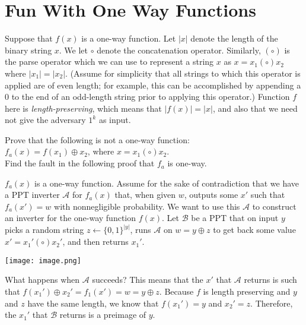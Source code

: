 \documentclass[10pt]{exam}
\begin{document}
\section{Fun With One Way Functions}
Suppose that $f(x)$ is a one-way function. Let $|x|$ denote the length of the binary string $x$. We let $\circ$ denote the concatenation operator. Similarly, $(\circ)$ is the parse operator which we can use to represent a string $x$ as $x = x_1(\circ)x_2$ where $|x_1| = |x_2|$. (Assume for simplicity that all strings to which this operator is applied are of even length; for example, this can be accomplished by appending a $0$ to the end of an odd-length string prior to applying this operator.) Function $f$ here is \textit{length-preserving}, which means that $|f(x)| = |x|$, and also that we need not give the adversary $1^k$ as input.
\begin{questions}


\question[3] Prove that the following is not a one-way function:\\
$f_a(x)=f(x_1)\oplus x_2$, where $x=x_1(\circ)x_2$.\\

\question[3] Find the fault in the following proof that $f_a$ is one-way.

$f_a(x)$ is a one-way function. Assume for the sake of contradiction that we have a PPT inverter $\mathcal{A}$ for $f_a(x)$ that, when given ${w}$, outputs some $x'$ such that $f_a(x')={w}$ with nonnegligible probability. We want to use this $\mathcal{A}$ to construct an inverter for the one-way function $f(x)$. Let $\mathcal{B}$ be a PPT that on input $y$ picks a random string $z\leftarrow \{0,1\}^{|y|}$, runs $\mathcal{A}$ on ${w}=y\oplus z$ to get back some value $x'=x_1'(\circ)x_2'$, and then returns $x_1'$.\\
\begin{center}
\texttt{[image: image.png]}\vspace{0.5cm}
\end{center}
What happens when $\mathcal{A}$ succeeds? This means that the $x'$ that $\mathcal{A}$ returns is such that $f(x_1')\oplus x_2'=f_1(x')={w}=y\oplus z$. Because $f$ is length preserving and $y$ and $z$ have the same length, we know that $f(x_1')=y$ and $x_2'=z$. Therefore, the $x_1'$ that $\mathcal{B}$ returns is a preimage of $y$. 


\end{questions}
\end{document}
